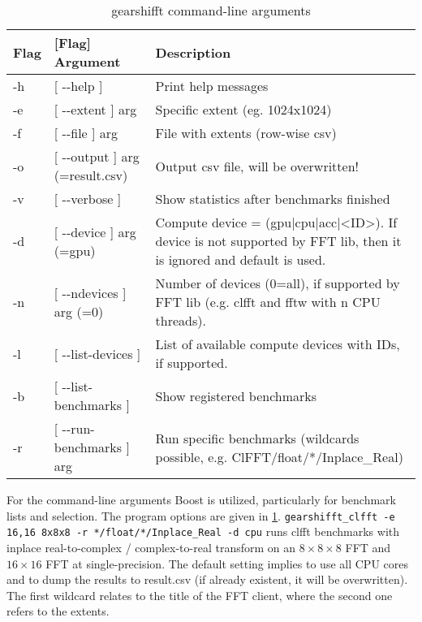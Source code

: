 \begin{table}[htp]
 \centering
 \caption{gearshifft command-line arguments}
 \label{tab:cmdargs}
  \begin{tabular}{llp{6.4cm}}
\toprule
Flag & [Flag] Argument & Description \\
\midrule
-h&[ -{}-help ]                    &Print help messages \\
-e&[ -{}-extent ] arg              &Specific extent (eg. 1024x1024) \\
-f&[ -{}-file ] arg                &File with extents (row-wise csv) \\
-o&[ -{}-output ] arg (=result.csv)&Output csv file, will be overwritten! \\
-v&[ -{}-verbose ]                 &Show statistics after benchmarks finished \\
-d&[ -{}-device ] arg (=gpu)       &Compute device = (gpu|cpu|acc|<ID>). If 
                                  device is not supported by FFT lib, then it
                                  is ignored and default is used. \\
-n&[ -{}-ndevices ] arg (=0)       &Number of devices (0=all), if supported by 
                                  FFT lib (e.g. clfft and fftw with n CPU 
                                  threads). \\
-l&[ -{}-list-devices ]            &List of available compute devices with IDs,
                                  if supported.  \\
-b&[ -{}-list-benchmarks ]         &Show registered benchmarks \\
-r&[ -{}-run-benchmarks ] arg      &Run specific benchmarks (wildcards 
                                  possible, e.g. ClFFT/float/*/Inplace\_Real)\\
\bottomrule
  \end{tabular}
\end{table}

For the command-line arguments Boost is utilized, particularly for benchmark lists and selection. The \gearshifft{} program options are given in \cref{tab:cmdargs}.\linebreak
\verb!gearshifft_clfft -e 16,16 8x8x8 -r */float/*/Inplace_Real -d cpu!\linebreak
runs clfft benchmarks with inplace real-to-complex / complex-to-real transform on an $8\times8\times8$ FFT and $16\times16$ FFT at single-precision. The default setting implies to use all CPU cores and to dump the results to result.csv (if already existent, it will be overwritten).
The first wildcard \mc{*} relates to the title of the FFT client, where the second one refers to the extents.

